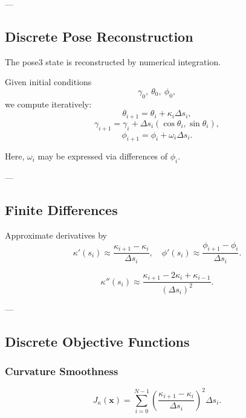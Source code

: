 ---

\subsection{Discrete Pose Reconstruction}

\begin{remark}
The pose3 state is reconstructed by numerical integration.
\end{remark}

\begin{definition}
Given initial conditions
\[
\gamma_0,\ \theta_0,\ \phi_0,
\]
we compute iteratively:
\[
\theta_{i+1} = \theta_i + \kappa_i \Delta s_i,
\]
\[
\gamma_{i+1} = \gamma_i + \Delta s_i
(\cos\theta_i,\sin\theta_i),
\]
\[
\phi_{i+1} = \phi_i + \omega_i \Delta s_i.
\]
\end{definition}

\begin{remark}
Here, \(\omega_i\) may be expressed via differences of \(\phi_i\).
\end{remark}

---

\subsection{Finite Differences}

\begin{definition}
Approximate derivatives by
\[
\kappa'(s_i)
\approx
\frac{\kappa_{i+1}-\kappa_i}{\Delta s_i},
\quad
\phi'(s_i)
\approx
\frac{\phi_{i+1}-\phi_i}{\Delta s_i}.
\]
\end{definition}

\begin{definition}
\[
\kappa''(s_i)
\approx
\frac{\kappa_{i+1}-2\kappa_i+\kappa_{i-1}}{(\Delta s_i)^2}.
\]
\end{definition}

---

\subsection{Discrete Objective Functions}

\subsubsection{Curvature Smoothness}

\[
J_\kappa(\mathbf{x})
=
\sum_{i=0}^{N-1}
\left(
\frac{\kappa_{i+1}-\kappa_i}{\Delta s_i}
\right)^2
\Delta s_i.
\]

